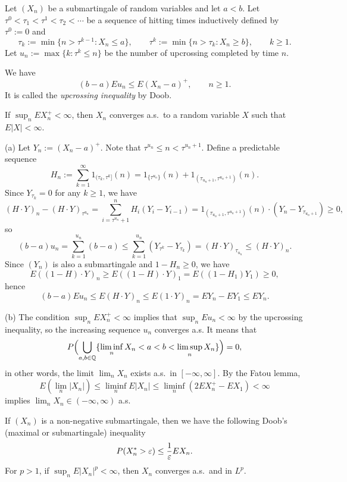 \documentclass{../../large}
\begin{document}
\begin{prb}
Let $(X_n)$ be a submartingale of random variables and let $a<b$.
Let $\tau^0<\tau_1<\tau^1<\tau_2<\cdots$ be a sequence of hitting times inductively defined by $\tau^0:=0$ and
\[\tau_k:=\min\{n>\tau^{k-1}:X_n\le a\},\qquad\tau^k:=\min\{n>\tau_k:X_n\ge b\},\qquad k\ge1.\]
Let $u_n:=\max\{k:\tau^k\le n\}$ be the number of upcrossing completed by time $n$.
\begin{parts}
\item We have
\[(b-a)Eu_n\le E(X_n-a)^+,\qquad n\ge1.\]
It is called the \emph{upcrossing inequality} by Doob.
\item If $\sup_nEX_n^+<\infty$, then $X_n$ converges a.s.~to a random variable $X$ such that $E|X|<\infty$.
\end{parts}
\end{prb}
\begin{pf}
(a)
Let $Y_n:=(X_n-a)^+$.
Note that $\tau^{u_n}\le n<\tau^{u_n+1}$.
Define a predictable sequence
\[H_n:=\sum_{k=1}^\infty1_{(\tau_k,\tau^k]}(n)=1_{\{\tau^{u_n}\}}(n)+1_{(\tau_{u_n+1},\tau^{u_n+1})}(n).\]
Since $Y_{\tau_k}=0$ for any $k\ge1$, we have
\[(H\cdot Y)_n-(H\cdot Y)_{\tau^{u_n}}=\sum_{i=\tau^{u_n}+1}^nH_i(Y_i-Y_{i-1})=1_{(\tau_{u_n+1},\tau^{u_n+1})}(n)\cdot(Y_n-Y_{\tau_{u_n+1}})\ge0,\]
so
\[(b-a)u_n=\sum_{k=1}^{u_n}(b-a)\le\sum_{k=1}^{u_n}(Y_{\tau^k}-Y_{\tau_k})=(H\cdot Y)_{\tau_{u_n}}\le(H\cdot Y)_n.\]
Since $(Y_n)$ is also a submartingale and $1-H_n\ge0$, we have
\[E((1-H)\cdot Y)_n\ge E((1-H)\cdot Y)_1=E((1-H_1)Y_1)\ge0,\]
hence
\[(b-a)Eu_n\le E(H\cdot Y)_n\le E(1\cdot Y)_n=EY_n-EY_1\le EY_n.\]

(b)
The condition $\sup_nEX_n^+<\infty$ implies that $\sup_nEu_n<\infty$ by the upcrossing inequality, so the increasing sequence $u_n$ converges a.s.
It means that
\[P\Bigl(\bigcup_{a,b\in\mathbb{Q}}\{\liminf_nX_n<a<b<\limsup_nX_n\}\Bigr)=0,\]
in other words, the limit $\lim_nX_n$ exists a.s.~in $[-\infty,\infty]$.
By the Fatou lemma,
\[E(\lim_n|X_n|)\le\liminf_nE|X_n|\le\liminf_n(2EX_n^+-EX_1)<\infty\]
implies $\lim_nX_n\in(-\infty,\infty)$ a.s.
\end{pf}



\begin{prb}
If $(X_n)$ is a non-negative submartingale, then we have the following Doob's (maximal or submartingale) inequality
\[P(X^*_n>\varepsilon)\le\frac1{\varepsilon} EX_n.\]
For $p>1$, if $\sup_nE|X_n|^p<\infty$, then $X_n$ converges a.s.~and in $L^p$.
\end{prb}
\end{document}
